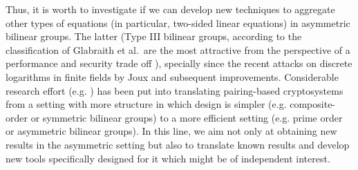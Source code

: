Thus, it is worth to investigate if we can develop new techniques to aggregate 
other types of equations (in particular, two-sided linear equations) in asymmetric bilinear groups. The latter (Type III bilinear groups, according to the classification of Glabraith et al.~are the most 
attractive 
from the perspective of a performance and security trade off \cite{DAM:GalPatSma08}), specially since the recent attacks on discrete logarithms in finite fields by Joux \cite{SAC:Joux13} and subsequent improvements. Considerable research effort 
(e.g. \cite{C:AGOT14a,EC:Freeman10})
has been put into translating pairing-based cryptosystems from a setting with more structure in which design is simpler (e.g. composite-order or symmetric bilinear groups) to a more efficient setting (e.g. prime order or asymmetric bilinear groups). In this line, we aim not only at obtaining new results in the asymmetric setting but also to translate known results and develop new tools specifically designed for it which might be of independent interest.


